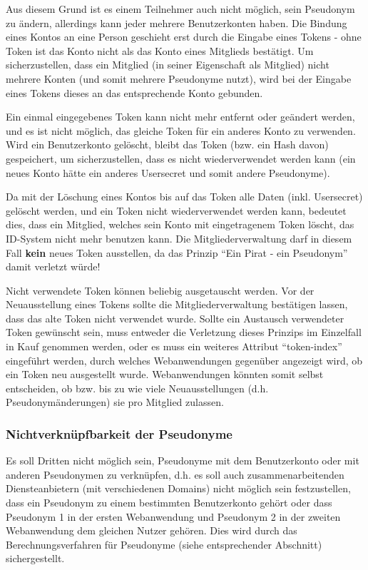 \documentclass[parskip=half]{scrartcl}
\begin{document}
Aus diesem Grund ist es einem Teilnehmer auch nicht möglich, sein Pseudonym zu ändern, allerdings kann jeder mehrere Benutzerkonten haben.
Die Bindung eines Kontos an eine Person geschieht erst durch die Eingabe eines Tokens - ohne Token ist das Konto nicht als das Konto eines Mitglieds bestätigt.
Um sicherzustellen, dass ein Mitglied (in seiner Eigenschaft als Mitglied) nicht mehrere Konten (und somit mehrere Pseudonyme nutzt),
wird bei der Eingabe eines Tokens dieses an das entsprechende Konto gebunden.

Ein einmal eingegebenes Token kann nicht mehr entfernt oder geändert werden, und es ist nicht möglich, das gleiche Token für ein anderes Konto zu verwenden.
Wird ein Benutzerkonto gelöscht, bleibt das Token (bzw. ein Hash davon) gespeichert, um sicherzustellen, dass es nicht wiederverwendet werden kann
(ein neues Konto hätte ein anderes Usersecret und somit andere Pseudonyme).

Da mit der Löschung eines Kontos bis auf das Token alle Daten (inkl. Usersecret) gelöscht werden, und ein Token nicht wiederverwendet werden kann,
bedeutet dies, dass ein Mitglied, welches sein Konto mit eingetragenem Token löscht, das ID-System nicht mehr benutzen kann.
Die Mitgliederverwaltung darf in diesem Fall \textbf{kein} neues Token ausstellen, da das Prinzip "`Ein Pirat - ein Pseudonym"' damit verletzt würde!

Nicht verwendete Token können beliebig ausgetauscht werden. Vor der Neuausstellung eines Tokens sollte die Mitgliederverwaltung bestätigen lassen,
dass das alte Token nicht verwendet wurde.
Sollte ein Austausch verwendeter Token gewünscht sein, muss entweder die Verletzung dieses Prinzips im Einzelfall in Kauf genommen werden,
oder es muss ein weiteres Attribut "`token-index"' eingeführt werden, durch welches Webanwendungen gegenüber angezeigt wird, ob ein Token neu ausgestellt wurde.
Webanwendungen könnten somit selbst entscheiden, ob bzw. bis zu wie viele Neuausstellungen (d.h. Pseudonymänderungen) sie pro Mitglied zulassen.


\subsubsection{Nichtverknüpfbarkeit der Pseudonyme}
Es soll Dritten nicht möglich sein, Pseudonyme mit dem Benutzerkonto oder mit anderen Pseudonymen zu verknüpfen,
d.h. es soll auch zusammenarbeitenden Diensteanbietern (mit verschiedenen Domains) nicht möglich sein festzustellen, 
dass ein Pseudonym zu einem bestimmten Benutzerkonto gehört oder dass
Pseudonym 1 in der ersten Webanwendung und Pseudonym 2 in der zweiten Webanwendung dem gleichen Nutzer gehören.
Dies wird durch das Berechnungsverfahren für Pseudonyme (siehe entsprechender Abschnitt) sichergestellt.
\end{document}
